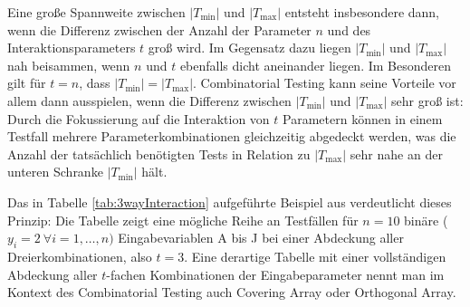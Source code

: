 Eine große Spannweite zwischen $|T_{\min}|$ und $|T_{\max}|$ entsteht insbesondere dann, wenn die Differenz zwischen der Anzahl der Parameter $n$ und des Interaktionsparameters $t$ groß wird. Im Gegensatz dazu liegen $|T_{\min}|$ und $|T_{\max}|$ nah beisammen, wenn $n$ und $t$ ebenfalls dicht aneinander liegen. Im Besonderen gilt für $t=n$, dass $|T_{\min}| = |T_{\max}|$. Combinatorial Testing kann seine Vorteile vor allem dann ausspielen, wenn die Differenz zwischen $|T_{\min}|$ und $|T_{\max}|$ sehr groß ist: Durch die Fokussierung auf die Interaktion von $t$ Parametern können in einem Testfall mehrere Parameterkombinationen gleichzeitig abgedeckt werden, was die Anzahl der tatsächlich benötigten Tests in Relation zu $|T_{\max}|$ sehr nahe an der unteren Schranke $|T_{\min}|$ hält.

Das in Tabelle \ref{tab:3wayInteraction} aufgeführte Beispiel aus \cite{kuhn2010practical} verdeutlicht dieses Prinzip: Die Tabelle zeigt eine mögliche Reihe an Testfällen für $n=10$ binäre ($y_i = 2 ~ \forall i = 1,\dots,n)$ Eingabevariablen A bis J bei einer Abdeckung aller Dreierkombinationen, also $t = 3$. Eine derartige Tabelle mit einer vollständigen Abdeckung aller $t$-fachen Kombinationen der Eingabeparameter nennt man im Kontext des Combinatorial Testing auch Covering Array oder Orthogonal Array. 

